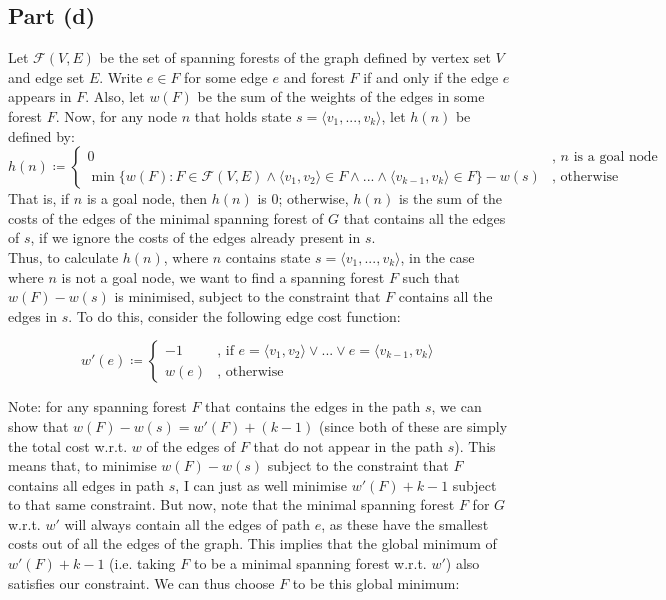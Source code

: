 \documentclass[a4paper,12pt]{scrartcl}
\begin{document}
\subsection*{Part (d)}
Let $\mathcal{F}(V, E)$ be the set of spanning forests of the graph defined by vertex set $V$ and edge set $E$. Write $e \in F$ for some edge $e$ and forest $F$ if and only if the edge $e$ appears in $F$. Also, let $w(F)$ be the sum of the weights of the edges in some forest $F$. Now, for any node $n$ that holds state $s = \langle v_1, ..., v_k \rangle$, let $h(n)$ be defined by:
\[
    h(n) \coloneqq
    \begin{cases}
        0 & \text{, $n$ is a goal node} \\
        \min \{ w(F) : F \in \mathcal{F}(V, E) \land \langle v_1, v_2 \rangle \in F \land ... \land \langle v_{k-1}, v_k \rangle \in F \} - w(s) & \text{, otherwise}
    \end{cases}
\]
That is, if $n$ is a goal node, then $h(n)$ is 0; otherwise, $h(n)$ is the sum of the costs of the edges of the minimal spanning forest of $G$ that contains all the edges of $s$, if we ignore the costs of the edges already present in $s$. \\
Thus, to calculate $h(n)$, where $n$ contains state $s = \langle v_1, ..., v_k \rangle$, in the case where $n$ is not a goal node, we want to find a spanning forest $F$ such that $w(F) - w(s)$ is minimised, subject to the constraint that $F$ contains all the edges in $s$. To do this, consider the following edge cost function:

\[
    w'(e) \coloneqq
    \begin{cases}
        -1 & \text{, if }e = \langle v_1, v_2 \rangle \lor ... \lor e = \langle v_{k-1}, v_k \rangle \\
        w(e) & \text{, otherwise}
    \end{cases}
\]

Note: for any spanning forest $F$ that contains the edges in the path $s$, we can show that $w(F) - w(s) = w'(F) + (k-1)$ (since both of these are simply the total cost w.r.t. $w$ of the edges of $F$ that do not appear in the path $s$). This means that, to minimise $w(F) - w(s)$ subject to the constraint that $F$ contains all edges in path $s$, I can just as well minimise $w'(F) + k - 1$ subject to that same constraint. But now, note that the minimal spanning forest $F$ for $G$ w.r.t. $w'$ will always contain all the edges of path $e$, as these have the smallest costs out of all the edges of the graph. This implies that the global minimum of $w'(F) + k - 1$ (i.e. taking $F$ to be a minimal spanning forest w.r.t. $w'$) also satisfies our constraint. We can thus choose $F$ to be this global minimum:
\end{document}
